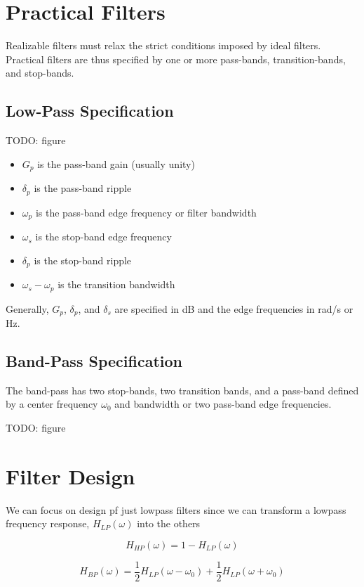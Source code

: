 \documentclass{article}
\begin{document}
\section{Practical Filters}

Realizable filters must relax the strict conditions imposed by ideal filters. Practical filters are thus specified by one or more pass-bands, transition-bands, and stop-bands.

\subsection{Low-Pass Specification}

TODO: figure

\begin{itemize}
\item $G_p$ is the pass-band gain (usually unity)
\item $\delta_p$ is the pass-band ripple
\item $\omega_p$ is the pass-band edge frequency or filter bandwidth
\item $\omega_s$ is the stop-band edge frequency
\item $\delta_p$ is the stop-band ripple
\item $\omega_s - \omega_p$ is the transition bandwidth
\end{itemize}

Generally, $G_p$, $\delta_p$, and $\delta_s$ are specified in dB and the edge frequencies in rad/s or Hz.

\subsection{Band-Pass Specification}

The band-pass has two stop-bands, two transition bands, and a pass-band defined by a center frequency $\omega_0$ and bandwidth or two pass-band edge frequencies.

TODO: figure

\section{Filter Design}

We can focus on design pf just lowpass filters since we can transform a lowpass frequency response, $H_{LP}(\omega)$ into the others

\[
H_{HP}(\omega) = 1-H_{LP}(\omega)
\]

\[
H_{BP}(\omega) = \frac{1}{2} H_{LP}(\omega-\omega_0) + \frac{1}{2} H_{LP}(\omega+\omega_0) 
\]
\end{document}
